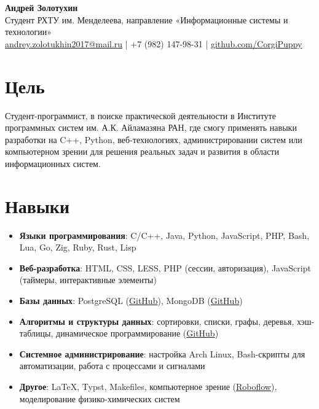 \documentclass[a4paper,11pt]{article}
\begin{document}
	\begin{center}
		{\Large\bfseries Андрей Золотухин} \\
		\vspace{0.2cm}
		Студент РХТУ им. Менделеева, направление «Информационные системы и технологии» \\
		\href{mailto:andrey.zolotukhin2017@mail.ru}{andrey.zolotukhin2017@mail.ru} | +7 (982) 147-98-31 | \href{https://github.com/CorgiPuppy}{github.com/CorgiPuppy}
	\end{center}

	\section{Цель}
	Студент-программист, в поиске практической деятельности в Институте программных систем им. А.К. Айламазяна РАН, где смогу применять навыки разработки на C++, Python, веб-технологиях, администрировании систем или компьютерном зрении для решения реальных задач и развития в области информационных систем.

	\section{Навыки}
	\begin{itemize}[leftmargin=*]
		\item \textbf{Языки программирования}: C/C++, Java, Python, JavaScript, PHP, Bash, Lua, Go, Zig, Ruby, Rust, Lisp
		\item \textbf{Веб-разработка}: HTML, CSS, LESS, PHP (сессии, авторизация), JavaScript (таймеры, интерактивные элементы)
		\item \textbf{Базы данных}: PostgreSQL (\href{https://github.com/CorgiPuppy/data-mgmt-labs/tree/master/lab6}{GitHub}), MongoDB (\href{https://github.com/CorgiPuppy/data-mgmt-labs/tree/master/lab8}{GitHub})
		\item \textbf{Алгоритмы и структуры данных}: сортировки, списки, графы, деревья, хэш-таблицы, динамическое программирование (\href{https://github.com/CorgiPuppy/algo-ds-labs}{GitHub})
		\item \textbf{Системное администрирование}: настройка Arch Linux, Bash-скрипты для автоматизации, работа с процессами и сигналами
		\item \textbf{Другое}: LaTeX, Typst, Makefiles, компьютерное зрение (\href{https://roboflow.com/}{Roboflow}), моделирование физико-химических систем
	\end{itemize}
\end{document}
